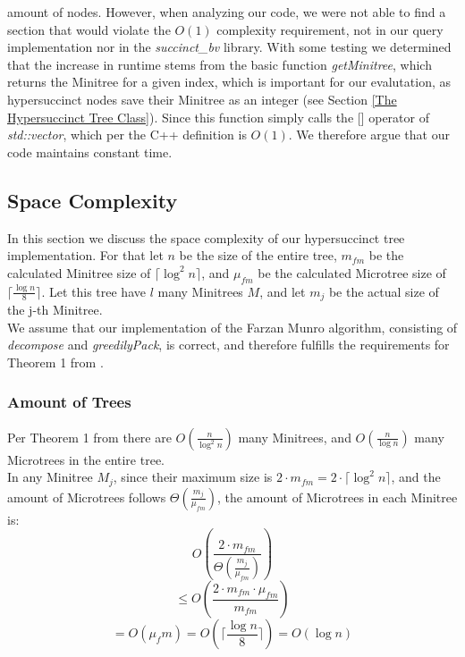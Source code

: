 \documentclass{article}
\begin{document}
amount of nodes. However, when analyzing our code, we were not able to find a section that would violate the $O(1)$ complexity requirement, not in our query implementation nor in the \textit{succinct\_bv} library. With some testing we determined that the increase in runtime stems from the basic function \textit{getMinitree}, which returns the Minitree for a given index, which is important for our evalutation, as hypersuccinct nodes save their Minitree as an integer (see Section \ref{The Hypersuccinct Tree Class}). Since this function simply calls the [] operator of \textit{std::vector}, which per the C++ definition is $O(1)$. We therefore argue that our code maintains constant time.

\subsection{Space Complexity} \label{Space Complexity}
In this section we discuss the space complexity of our hypersuccinct tree implementation. For that  let $n$ be the size of the entire tree, $m_{fm}$ be the calculated Minitree size of $\lceil \log^{2} n \rceil$, and $\mu_{fm}$ be the calculated Microtree size of $\lceil \frac{\log n}{8} \rceil$. Let this tree have $l$ many Minitrees $M$, and let $m_{j}$ be the actual size of the j-th Minitree.\\

We assume that our implementation of the Farzan Munro algorithm, consisting of \textit{decompose} and \textit{greedilyPack}, is correct, and therefore fulfills the requirements for Theorem 1 from \cite{farzanMunro}.

\subsubsection{Amount of Trees} \label{Amount of Trees}
Per Theorem 1 from \cite{farzanMunro} there are $O(\frac{n}{\log ^{2} n})$ many Minitrees, and $O(\frac{n}{\log {n}})$ many Microtrees in the entire tree.\\
In any Minitree $M_{j}$, since their maximum size is $2 \cdot m_{fm} = 2 \cdot \lceil \log^{2} n \rceil$, and the amount of Microtrees follows $\Theta (\frac{m_{j}}{\mu_{fm}})$, the amount of Microtrees in each Minitree is:
$$O \left( \frac{2 \cdot m_{fm}}{\Theta \left( \frac{m_{j}}{\mu_{fm}}\right) }\right) $$
$$\leq O \left( \frac{2 \cdot m_{fm} \cdot \mu_{fm}}{m_{fm}} \right)$$
$$ = O(\mu_fm) = O \left( \lceil \frac{\log n}{8} \rceil \right) = O(\log n)$$\\
\end{document}

